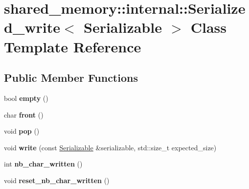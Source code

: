 \hypertarget{classshared__memory_1_1internal_1_1Serialized__write}{}\section{shared\+\_\+memory\+:\+:internal\+:\+:Serialized\+\_\+write$<$ Serializable $>$ Class Template Reference}
\label{classshared__memory_1_1internal_1_1Serialized__write}
\subsection*{Public Member Functions}
\begin{DoxyCompactItemize}
\item 
bool {\bfseries empty} ()\hypertarget{classshared__memory_1_1internal_1_1Serialized__write_a1166684494bff2d969ca16ccbeee486a}{}\label{classshared__memory_1_1internal_1_1Serialized__write_a1166684494bff2d969ca16ccbeee486a}

\item 
char {\bfseries front} ()\hypertarget{classshared__memory_1_1internal_1_1Serialized__write_a96412580e8aedd0e1fa90f8b64e4745f}{}\label{classshared__memory_1_1internal_1_1Serialized__write_a96412580e8aedd0e1fa90f8b64e4745f}

\item 
void {\bfseries pop} ()\hypertarget{classshared__memory_1_1internal_1_1Serialized__write_adf6c52536a53dbc1181eab1409a3641b}{}\label{classshared__memory_1_1internal_1_1Serialized__write_adf6c52536a53dbc1181eab1409a3641b}

\item 
void {\bfseries write} (const \hyperlink{classSerializable}{Serializable} \&serializable, std\+::size\+\_\+t expected\+\_\+size)\hypertarget{classshared__memory_1_1internal_1_1Serialized__write_a32f8f7e6faabf358283736f51e40b33c}{}\label{classshared__memory_1_1internal_1_1Serialized__write_a32f8f7e6faabf358283736f51e40b33c}

\item 
int {\bfseries nb\+\_\+char\+\_\+written} ()\hypertarget{classshared__memory_1_1internal_1_1Serialized__write_a830ed6c58591e8284ecb1b8b2e936e03}{}\label{classshared__memory_1_1internal_1_1Serialized__write_a830ed6c58591e8284ecb1b8b2e936e03}

\item 
void {\bfseries reset\+\_\+nb\+\_\+char\+\_\+written} ()\hypertarget{classshared__memory_1_1internal_1_1Serialized__write_a58b23378ce903e1aadf7c5e497022e5f}{}\label{classshared__memory_1_1internal_1_1Serialized__write_a58b23378ce903e1aadf7c5e497022e5f}

\end{DoxyCompactItemize}
